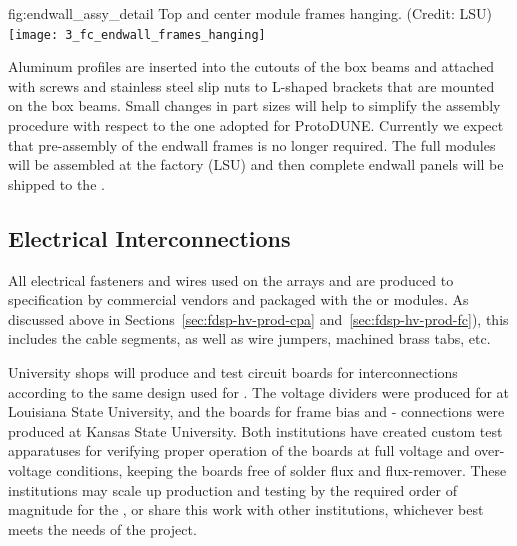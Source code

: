\begin{dunefigure} %
{fig:endwall_assy_detail}{%
Top and center  module frames hanging. (Credit: LSU)}
\texttt{[image: 3\_fc\_endwall\_frames\_hanging]}
\end{dunefigure}


Aluminum profiles are inserted into the cutouts of the box beams and attached with screws and stainless steel slip nuts to L-shaped  brackets that are mounted on the  box beams. Small changes in part sizes will help to simplify the assembly  procedure with respect to the one adopted for ProtoDUNE. Currently we expect that pre-assembly of the  endwall frames is no longer required. The full modules will be assembled at the factory (LSU) and then complete  endwall panels will be shipped to the . 


\subsection{Electrical Interconnections}
\label{sec:fdsp-hv-prod-interconnect}

All electrical fasteners and wires used on the  arrays and  are produced
to specification by commercial vendors and packaged with the  or  modules.  
As discussed above in Sections~\ref{sec:fdsp-hv-prod-cpa} and~\ref{sec:fdsp-hv-prod-fc}), 
this includes the  cable segments, as well as wire jumpers, machined brass
tabs, etc.

University shops will produce and test circuit boards for %
 interconnections according to the same design used for .  The  voltage dividers were produced for  at Louisiana State University, and the boards for  frame bias and - connections were produced at Kansas State University.
Both institutions have created custom test apparatuses for verifying proper operation of the boards at full voltage and over-voltage conditions, keeping the boards free of solder flux and flux-remover.  These institutions may scale up production and testing by the required order of magnitude for the , or share this work with other institutions, whichever best meets the needs of the project. %


